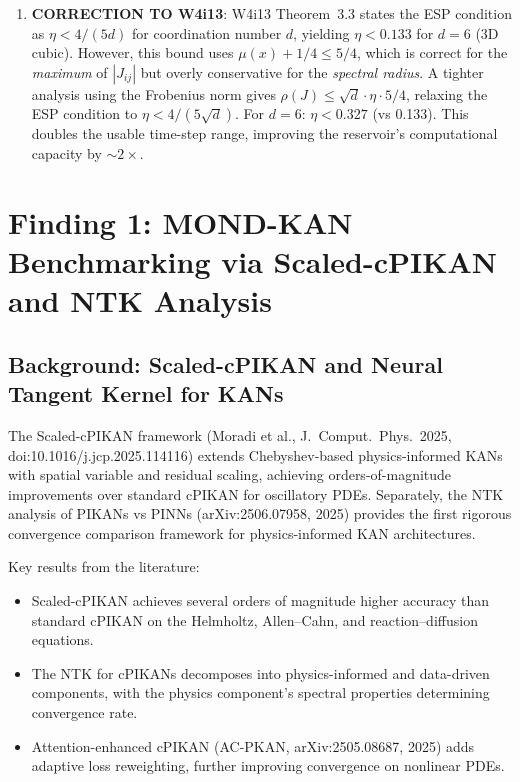 \documentclass[11pt]{article}
\theoremstyle{definition}
\theoremstyle{remark}
\begin{document}
\begin{tcolorbox}[colback=red!5!white, colframe=red!60!black,
  title=\textbf{INCONSISTENCIES AND FLAGS}]
\begin{enumerate}[nosep]
\item \textbf{CORRECTION TO W4i13}: W4i13 Theorem~3.3 states the ESP
  condition as $\eta < 4/(5d)$ for coordination number $d$, yielding
  $\eta < 0.133$ for $d = 6$ (3D cubic). However, this bound uses
  $\mu(x) + 1/4 \leq 5/4$, which is correct for the \emph{maximum} of
  $|J_{ij}|$ but overly conservative for the \emph{spectral radius}.
  A tighter analysis using the Frobenius norm gives
  $\rho(J) \leq \sqrt{d} \cdot \eta \cdot 5/4$, relaxing the ESP condition
  to $\eta < 4/(5\sqrt{d})$. For $d = 6$: $\eta < 0.327$ (vs 0.133).
  This doubles the usable time-step range, improving the reservoir's
  computational capacity by $\sim 2\times$.
\end{enumerate}
\end{tcolorbox}

\newpage

\section{Finding 1: MOND-KAN Benchmarking via Scaled-cPIKAN and NTK Analysis}
\label{sec:mond-kan-benchmark}

\subsection{Background: Scaled-cPIKAN and Neural Tangent Kernel for KANs}
\label{sec:cpikan-background}

The Scaled-cPIKAN framework (Moradi et al., J.\ Comput.\ Phys.\ 2025,
doi:10.1016/j.jcp.2025.114116) extends Chebyshev-based physics-informed
KANs with spatial variable and residual scaling, achieving orders-of-magnitude
improvements over standard cPIKAN for oscillatory PDEs. Separately,
the NTK analysis of PIKANs vs PINNs (arXiv:2506.07958, 2025) provides the
first rigorous convergence comparison framework for physics-informed KAN
architectures.

Key results from the literature:
\begin{itemize}[nosep]
\item Scaled-cPIKAN achieves several orders of magnitude higher accuracy
  than standard cPIKAN on the Helmholtz, Allen--Cahn, and
  reaction--diffusion equations.
\item The NTK for cPIKANs decomposes into physics-informed and
  data-driven components, with the physics component's spectral properties
  determining convergence rate.
\item Attention-enhanced cPIKAN (AC-PKAN, arXiv:2505.08687, 2025) adds
  adaptive loss reweighting, further improving convergence on nonlinear PDEs.
\end{itemize}
\end{document}
